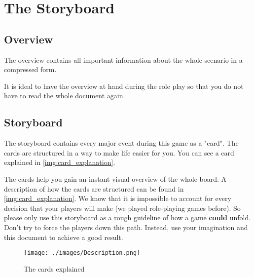 \chapter{The Storyboard}
\label{sec:storyboard_main}

\section{Overview}

The overview contains all important information about the whole scenario in a compressed form.

\begin{hint}
    It is ideal to have the overview at hand during the role play so that you do not have to read the whole document again.
\end{hint}
\section{Storyboard}
\label{sec:storyboard}

The storyboard contains every major event during this game as a "card".
The cards are structured in a way to make life easier for you.
You can see a card explained in \autoref{img:card_explanation}.
\\

\begin{hint}
    The cards help you gain an instant visual overview of the whole board.
    A description of how the cards are structured can be found in \autoref{img:card_explanation}.
    We know that it is impossible to account for every decision that your players will make (we played role-playing games before).
    So please only use this storyboard as a rough guideline of how a game \textbf{could} unfold.
    Don't try to force the players down this path. 
    Instead, use your imagination and this document to achieve a good result.
\end{hint}

\begin{figure}[h!p]
    \centering
    \texttt{[image: ./images/Description.png]}
    \caption{The cards explained}
    \label{img:card_explanation}
\end{figure}